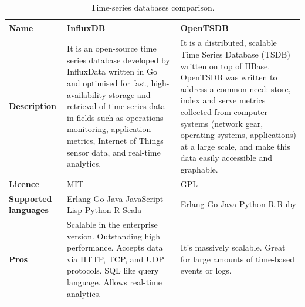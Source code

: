 \begin{table}[H]
\caption{Time-series databases comparison.}
\label{table:time_series_databases_comparison}
\centering
\large
\begin{tabularx}{\linewidth} {
    |>{\hsize=0.50\hsize}X| 
     >{\hsize=1.25\hsize}X|
     >{\hsize=1.25\hsize}X| }
    \hline
    \textbf{Name} 
    & InfluxDB \cite{influxdb}
    & OpenTSDB \cite{opentsdb} \\ \hline
    \textbf{Description} 
    & It is an open-source time series database developed by InfluxData written in Go and optimised for fast, high-availability storage and retrieval of time series data in fields such as operations monitoring, application metrics, Internet of Things sensor data, and real-time analytics.
    & It is a distributed, scalable Time Series Database (TSDB) written on top of HBase. OpenTSDB was written to address a common need: store, index and serve metrics collected from computer systems (network gear, operating systems, applications) at a large scale, and make this data easily accessible and graphable. \\ \hline
    \textbf{Licence}
    & MIT 
    & GPL \\ \hline
    \textbf{Supported languages} 
    & Erlang \newline
    Go \newline
    Java \newline
    JavaScript \newline
    Lisp \newline
    Python \newline
    R \newline
    Scala
    & Erlang \newline
    Go \newline
    Java \newline
    Python \newline
    R \newline
    Ruby \\ \hline
    \textbf{Pros} 
    & Scalable in the enterprise version. \newline
    Outstanding high performance. \newline
    Accepts data via HTTP, TCP, and UDP protocols. \newline
    SQL like query language. \newline
    Allows real-time analytics.
    & It's massively scalable. \newline
    Great for large amounts of time-based events or logs. \newline

\end{tabularx}
\end{table}
